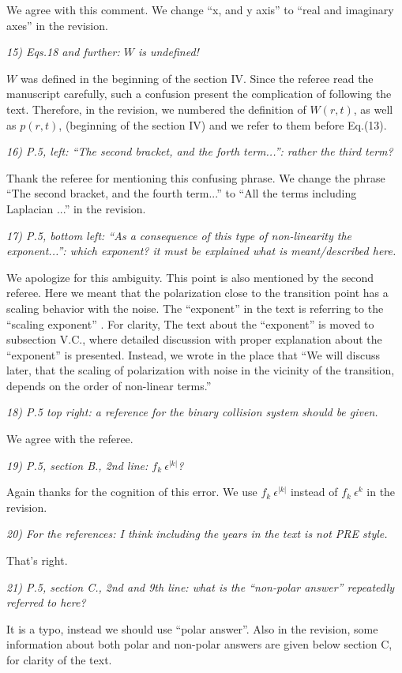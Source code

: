 \documentclass[a4paper,11pt]{letter}
\newcommand{\w}{W}
\newcommand{\rf}[1]{\textit{\textcolor{hlcolor}{#1}}}
\begin{document}
We agree with this comment. We change ``x, and y axis'' to ``real and imaginary axes'' in the revision.

\rf{15) Eqs.18 and further: $W$ is undefined!}

$\w$ was defined in the beginning of the section IV. Since the referee read the manuscript carefully, such a confusion present the complication of following the text. Therefore, in the revision, we numbered the definition of $W(r,t)$, as well as $p(r,t)$, (beginning of the section IV) and we refer to them before Eq.(13).

\rf{16) P.5, left: ``The second bracket, and the forth term...'': rather the third term?}

Thank the referee for mentioning this confusing phrase. We change the phrase ``The second bracket, and the fourth term...'' to ``All the terms including Laplacian ...'' in the revision.

\rf{17) P.5, bottom left: ``As a consequence of this type of non-linearity the exponent...'': which exponent? it must be explained what is meant/described here.}

We apologize for this ambiguity. This point is also mentioned by the second referee. Here we meant that the polarization close to the transition point has a scaling behavior with the noise. The ``exponent'' in the text is referring to the ``scaling exponent'' . For clarity, The text about the ``exponent'' is moved to subsection V.C., where detailed discussion with proper explanation about the ``exponent'' is presented. Instead, we wrote in the place that ``We will discuss later, that the scaling of polarization with noise in the vicinity of the transition, depends on the order of non-linear terms.''

\rf{18) P.5 top right: a reference for the binary collision system should be given.}

We agree with the referee.

\rf{19) P.5, section B., 2nd line: $f_k~\epsilon^|k|$?}

Again thanks for the cognition of this error. We use $f_k~\epsilon^|k|$ instead of $f_k~\epsilon^k$ in the revision.

\rf{20) For the references: I think including the years in the text is not PRE style.}

That's right.

\rf{21) P.5, section C., 2nd and 9th line: what is the ``non-polar answer'' repeatedly referred to here?}

It is a typo, instead we should use ``polar answer''. Also in the revision, some information about both polar and non-polar answers are given below section C, for clarity of the text. 
\end{document}
